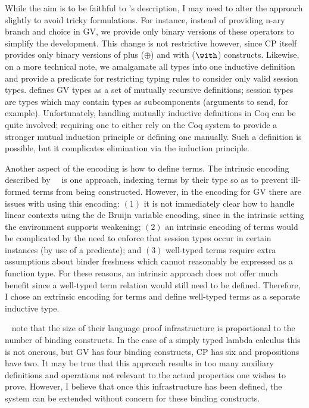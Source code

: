 \documentclass{mprop}
\begin{document}
While the aim is to be faithful to \citeauthor{Wadler:2012}'s description, I may need to alter the approach slightly to avoid tricky formulations. For instance, instead of providing n-ary branch and choice in GV, we provide only binary versions of these operators to simplify the development. This change is not restrictive however, since CP itself provides only binary versions of plus ($\oplus$) and with ($\with$) constructs. Likewise, on a more technical note, we amalgamate all types into one inductive definition and provide a predicate for restricting typing rules to consider only valid session types. \citeauthor{Wadler:2012} defines GV types as a set of mutually recursive definitions; session types are types which may contain types as subcomponents (arguments to send, for example). Unfortunately, handling mutually inductive definitions in Coq can be quite involved; requiring one to either rely on the Coq system to provide a stronger mutual induction principle or defining one manually. Such a definition is possible, but it complicates elimination via the induction principle.

Another aspect of the encoding is how to define terms. The intrinsic encoding described by~\citeauthor{Benton:2012:STT}~\cite{Benton:2012:STT} is one approach, indexing terms by their type so as to prevent ill-formed terms from being constructed. However, in the encoding for GV there are issues with using this encoding: $(1)$ it is not immediately clear how to handle linear contexts using the de Bruijn variable encoding, since in the intrinsic setting the environment supports weakening; $(2)$ an intrinsic encoding of terms would be complicated by the need to enforce that session types occur in certain instances (by use of a predicate); and $(3)$ well-typed terms require extra assumptions about binder freshness which cannot reasonably be expressed as a function type. For these reasons, an intrinsic approach does not offer much benefit since a well-typed term relation would still need to be defined. Therefore, I chose an extrinsic encoding for terms and define well-typed terms as a separate inductive type.

\citeauthor{Aydemir:2008:EFM}~\cite{Aydemir:2008:EFM} note that the size of their language proof infrastructure is proportional to the number of binding constructs. In the case of a simply typed lambda calculus this is not onerous, but GV has four binding constructs, CP has six and propositions have two. It may be true that this approach results in too many auxiliary definitions and operations not relevant to the actual properties one wishes to prove. However, I believe that once this infrastructure has been defined, the system can be extended without concern for these binding constructs.
\end{document}
